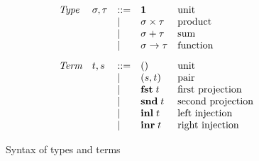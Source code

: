 \begin{figure}
  \small
  \[
  \begin{array}{lllll}
    \textit{Type} &
    \sigma, \tau
    & ::= &
    \mathbf{1}
    &
    \text{unit}
    \\
    && | &
    \sigma \times \tau
    &
    \text{product}
    \\
    && | &
    \sigma + \tau
    &
    \text{sum}
    \\
    && | &
    \sigma \to \tau
    &
    \text{function}
    \\[3mm]
    \textit{Term} &
    t, s
    & ::= &
    ()
    &
    \text{unit}
    \\
    && | &
    (s,t)
    &
    \text{pair}
    \\
    && | &
    \mathbf{fst}\;t
    &
    \text{first projection}
    \\
    && | &
    \mathbf{snd}\;t
    &
    \text{second projection}
    \\
    && | &
    \mathbf{inl}\;t
    &
    \text{left injection}
    \\
    && | &
    \mathbf{inr}\;t
    &
    \text{right injection}
  \end{array}
  \]
  \caption{Syntax of types and terms}
\end{figure}
